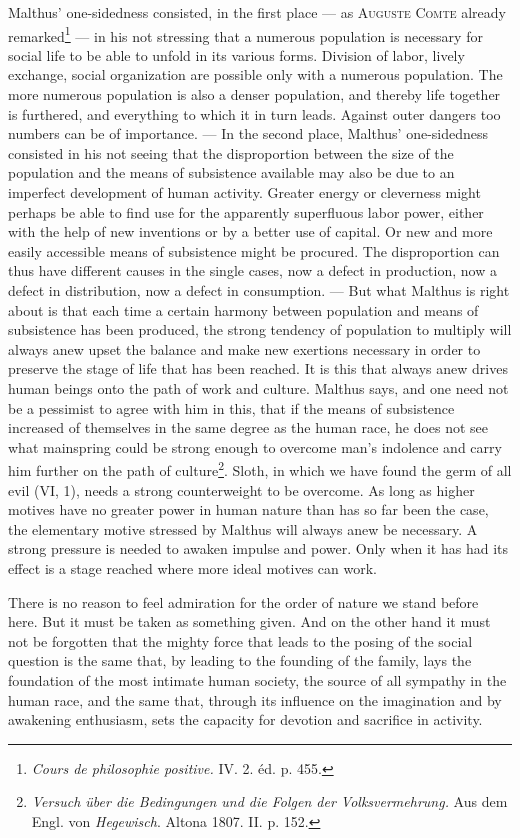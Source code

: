 \documentclass[12pt,a4paper,openany]{book}
\newcommand{\opage}[1]{\marginnote{\footnotesize\textit{[#1]}}}
\begin{document}
Malthus' one-sidedness consisted, in the first place --- as \textsc{Auguste Comte} already remarked\footnote[1]{\textit{Cours
de philosophie positive.} IV. 2. éd. p. 455.} --- in his not stressing that a numerous population is necessary for social
life to be able to unfold in its various forms. Division of labor, lively exchange, social organization are possible only
with a numerous population. The more numerous population is also a denser population, and thereby life together is
furthered, and everything to which it in turn leads. Against outer dangers too numbers can be of importance. --- In the
second place, Malthus' one-sidedness consisted in his not seeing that the disproportion between the size of the
population and the means of subsistence available may also be due to an imperfect development of human activity. Greater
energy or cleverness might perhaps be able to find use for the apparently superfluous labor power, either with the help of
new inventions or by a better use of capital. Or new and more easily accessible means of subsistence might be procured.
The disproportion can thus have different causes in the single cases, now a defect in production, now a defect in
distribution, now a defect in consumption.
\opage{368}--- But what Malthus is right about is that each time a certain harmony between population and means of
subsistence has been produced, the strong tendency of population to multiply will always anew upset the balance and make
new exertions necessary in order to preserve the stage of life that has been reached. It is this that always anew drives
human beings onto the path of work and culture. Malthus says, and one need not be a pessimist to agree with him in this,
that if the means of subsistence increased of themselves in the same degree as the human race, he does not see what
mainspring could be strong enough to overcome man's indolence and carry him further on the path of
culture\footnote[1]{\textit{Versuch über die Bedingungen und die Folgen der Volksvermehrung.} Aus dem Engl. von
\emph{Hegewisch}. Altona 1807. II. p. 152.}. Sloth, in which we have found the germ of all evil (VI, 1), needs a strong
counterweight to be overcome. As long as higher motives have no greater power in human nature than has so far been the
case, the elementary motive stressed by Malthus will always anew be necessary. A strong pressure is needed to awaken
impulse and power. Only when it has had its effect is a stage reached where more ideal motives can work.

There is no reason to feel admiration for the order of nature we stand before here. But it must be taken as something
given. And on the other hand it must not be forgotten that the mighty force that leads to the posing of the social
question is the same that, by leading to the founding of the family, lays the foundation of the most intimate human
society, the source of all sympathy in the human race, and the same that, through its influence on the imagination and by
awakening enthusiasm, sets the capacity for devotion and sacrifice in activity.
\end{document}
